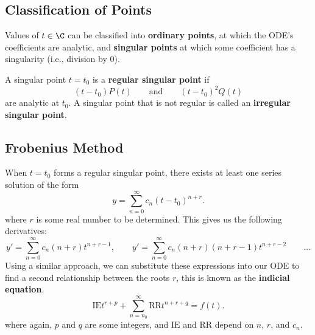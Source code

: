 \documentclass{article}
\begin{document}
\subsection{Classification of Points}
Values of \(t \in \C\) can be classified into \textbf{ordinary points}, at which the ODE's coefficients are analytic,
and \textbf{singular points} at which some coefficient has a singularity (i.e., division by 0).

A singular point \(t = t_0\) is a \textbf{regular singular point} if
\begin{equation*}
    \left( t - t_0 \right) P\left( t \right) \qquad \text{and} \qquad \left( t - t_0 \right)^2 Q\left( t \right)
\end{equation*}
are analytic at \(t_0\).
A singular point that is not regular is called an \textbf{irregular singular point}.
\subsection{Frobenius Method}
When \(t = t_0\) forms a regular singular point, there exists at least one
series solution of the form
\begin{equation*}
    y = \sum_{n = 0}^\infty c_n \left( t - t_0 \right)^{n + r}.
\end{equation*}
where \(r\) is some real number to be determined.
This gives us the following derivatives:
\begin{equation*}
    y' = \sum_{n = 0}^\infty c_n \left( n + r \right) t^{n + r - 1}, \qquad y' = \sum_{n = 0}^\infty c_n \left( n + r \right) \left( n + r - 1 \right) t^{n + r - 2} \qquad \dots
\end{equation*}
Using a similar approach, we can substitute these expressions into our ODE to find a second relationship
between the roots \(r\), this is known as the \textbf{indicial equation}.
\begin{equation*}
    \mathrm{IE} t^{r + p} + \sum_{n = n_0}^\infty \mathrm{RR} t^{n + r + q} = f\left( t \right).
\end{equation*}
where again, \(p\) and \(q\) are some integers, and \(\mathrm{IE}\) and \(\mathrm{RR}\) depend on \(n\), \(r\), and \(c_n\).
\end{document}
